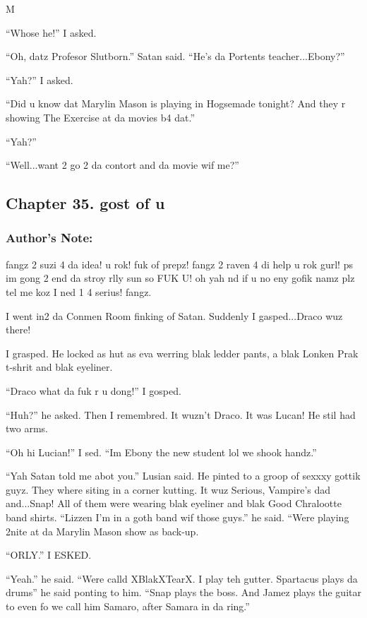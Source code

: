 M\documentclass{article}
\begin{document}
“Whose he!” I asked.

“Oh, datz Profesor Slutborn.” Satan said. “He’s da Portents teacher...Ebony?”

“Yah?” I asked.

“Did u know dat Marylin Mason is playing in Hogsemade tonight? And they r showing The Exercise at da movies b4 dat.”

“Yah?”

“Well...want 2 go 2 da contort and da movie wif me?”

\clearpage\nolinenumbers
\subsection*{Chapter 35. gost of u}

\subsubsection*{Author's Note: }fangz 2 suzi 4 da idea! u rok! fuk of prepz! fangz 2 raven 4 di help u rok gurl! ps im gong 2 end da stroy rlly sun so FUK U! oh yah nd if u no eny gofik namz plz tel me koz I ned 1 4 serius! fangz.

\textbreak
\linenumbers\resetlinenumber

I went in2 da Conmen Room finking of Satan. Suddenly I gasped...Draco wuz there!

I grasped. He locked as hut as eva werring blak ledder pants, a blak Lonken Prak t-shrit and blak eyeliner.

“Draco what da fuk r u dong!” I gosped.

“Huh?” he asked. Then I remembred. It wuzn’t Draco. It was Lucan! He stil had two arms.

“Oh hi Lucian!” I sed. “Im Ebony the new student lol we shook handz.”

“Yah Satan told me abot you.” Lusian said. He pinted to a groop of sexxxy gottik guyz. They where siting in a corner kutting. It wuz Serious, Vampire’s dad and...Snap! All of them were wearing blak eyeliner and blak Good Chralootte band shirts. “Lizzen I’m in a goth band wif those guys.” he said. “Were playing 2nite at da Marylin Mason show as back-up.

“ORLY.” I ESKED.

“Yeah.” he said. “Were calld XBlakXTearX. I play teh gutter. Spartacus plays da drums” he said ponting to him. “Snap plays the boss. And Jamez plays the guitar to even fo we call him Samaro, after Samara in da ring.”
\end{document}
